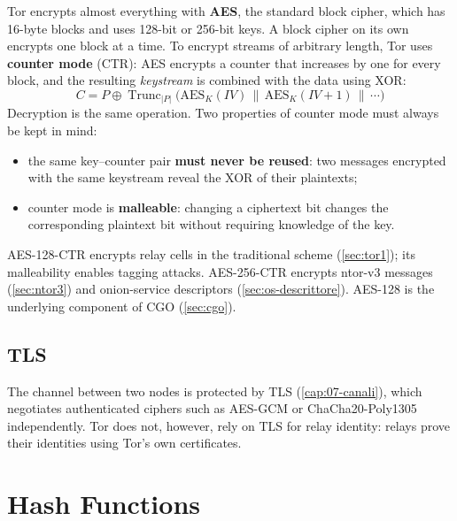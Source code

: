 Tor encrypts almost everything with \textbf{AES}, the standard block cipher, which has 16-byte blocks and uses 128-bit or 256-bit keys. A block cipher on its own encrypts one block at a time. To encrypt streams of arbitrary length, Tor uses \textbf{counter mode} (CTR): AES encrypts a counter that increases by one for every block, and the resulting \emph{keystream} is combined with the data using XOR:
\[ C = P \oplus \operatorname{Trunc}_{|P|}\bigl(\mathrm{AES}_K(\mathit{IV}) \,\|\, \mathrm{AES}_K(\mathit{IV}+1) \,\|\, \cdots\bigr) \]
Decryption is the same operation. Two properties of counter mode must always be kept in mind:
\begin{itemize}
  \item the same key--counter pair \textbf{must never be reused}: two messages encrypted with the same keystream reveal the XOR of their plaintexts;
  \item counter mode is \textbf{malleable}: changing a ciphertext bit changes the corresponding plaintext bit without requiring knowledge of the key.
\end{itemize}
AES-128-CTR encrypts relay cells in the traditional scheme (\cref{sec:tor1}); its malleability enables tagging attacks. AES-256-CTR encrypts ntor-v3 messages (\cref{sec:ntor3}) and onion-service descriptors (\cref{sec:os-descrittore}). AES-128 is the underlying component of CGO (\cref{sec:cgo}).

\subsection{TLS}

The channel between two nodes is protected by TLS (\cref{cap:07-canali}), which negotiates authenticated ciphers such as AES-GCM or ChaCha20-Poly1305 independently. Tor does not, however, rely on TLS for relay identity: relays prove their identities using Tor's own certificates.

\section{Hash Functions}\label{sec:cripto-hash}

